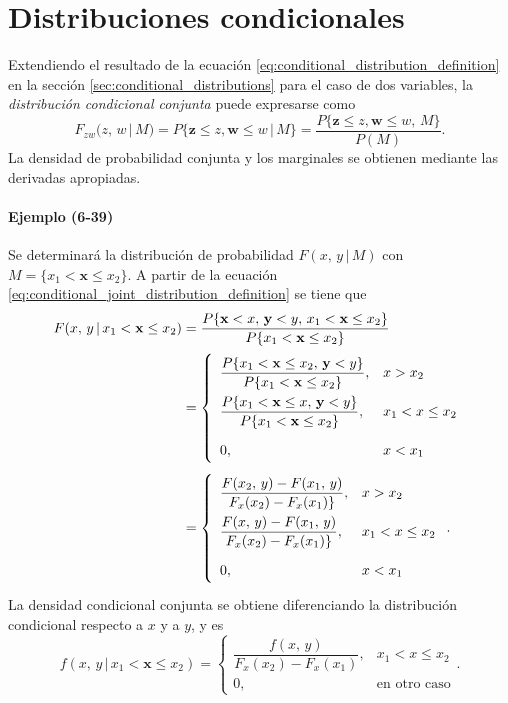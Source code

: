 \documentclass[a4paper]{report}
\newcommand{\x}{\mathbf{x}}
\newcommand{\y}{\mathbf{y}}
\newcommand{\w}{\mathbf{w}}
\newcommand{\z}{\mathbf{z}}
\begin{document}
\section{Distribuciones condicionales}\label{sec:joint_conditional_distributions}

Extendiendo el resultado de la ecuación \ref{eq:conditional_distribution_definition} en la sección \ref{sec:conditional_distributions} para el caso de dos variables, la \emph{distribución condicional conjunta} puede expresarse como
\begin{equation}\label{eq:conditional_joint_distribution_definition}
 F_{zw}(z,\,w\,|\,M)=P\{\z\leq z,\w\leq w\,|\,M\}=\frac{P\{\z\leq z,\w\leq w,\,M\}}{P(M)}.
\end{equation}
La densidad de probabilidad conjunta y los marginales se obtienen mediante las derivadas apropiadas.

\paragraph{Ejemplo (6-39)} Se determinará la distribución de probabilidad \(F(x,\,y\,|\,M)\) con \(M=\{x_1<\x\leq x_2\}\). A partir de la ecuación \ref{eq:conditional_joint_distribution_definition} se tiene que
\[ \def\arraystretch{2.2}
\begin{aligned}
 F(x,\,y\,|\,x_1<\x\leq x_2)&=\frac{P\{\x<x,\,\y<y,\,x_1<\x\leq x_2\}}{P\{x_1<\x\leq x_2\}} \\
 &=\left\{\begin{array}{ll}
   \dfrac{P\{x_1<\x\leq x_2,\,\y<y\}}{P\{x_1<\x\leq x_2\}}, &  x>x_2\\
   \dfrac{P\{x_1<\x\leq x,\,\y<y\}}{P\{x_1<\x\leq x_2\}}, & x_1<x\leq x_2\\ 
   0, & x<x_1
 \end{array} \right.\\
 &=\left\{\begin{array}{ll}
   \dfrac{F(x_2,\,y)-F(x_1,\,y)}{F_x(x_2)-F_x(x_1)\}}, &  x>x_2\\
   \dfrac{F(x,\,y)-F(x_1,\,y)}{F_x(x_2)-F_x(x_1)\}}, & x_1<x\leq x_2\\ 
   0, & x<x_1
 \end{array} \right..
\end{aligned}
\]
La densidad condicional conjunta se obtiene diferenciando la distribución condicional respecto a \(x\) y a \(y\), y es
\begin{equation}\label{eq:conditional_joint_density_aux}
 f(x,\,y\,|\,x_1<\x\leq x_2)
 =\left\{\begin{array}{ll}
   \dfrac{f(x,\,y)}{F_x(x_2)-F_x(x_1)}, & x_1<x\leq x_2\\ 
   0, & \textrm{en otro caso}
 \end{array} \right..
\end{equation}
\end{document}

